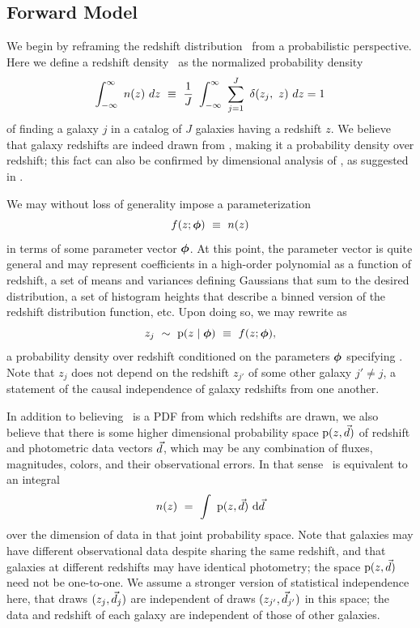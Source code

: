 \subsection{Forward Model}

We begin by reframing the redshift distribution \nz\ from a probabilistic perspective.
Here we define a redshift density \nz\ as the normalized probability density
\begin{equation}
\eqlabel{eqn:nz}
\int_{-\infty}^{\infty}\ n(z)\ dz\ \equiv\ \frac{1}{J}\ \int_{-\infty}^{\infty}\ \sum_{j=1}^{J}\ \delta(z_{j},\ z)\ dz = 1
\end{equation}
of finding a galaxy $j$ in a catalog of $J$ galaxies having a redshift $z$.
We believe that galaxy redshifts are indeed drawn from \nz, making it a probability density over redshift; this fact can also be confirmed by dimensional analysis of , as suggested in \citet{hogg_data_2012}.

We may without loss of generality impose a parameterization
\begin{equation}
\eqlabel{eqn:fz}
f(z; \ndphi)\ \equiv\ n(z)
\end{equation}
in terms of some parameter vector ${\boldsymbol{\phi}}$.
At this point, the parameter vector is quite general and may represent coefficients in a high-order polynomial as a function of redshift, a set of means and variances defining Gaussians that sum to the desired distribution, a set of histogram heights that describe a binned version of the redshift distribution function, etc.
Upon doing so, we may rewrite  as 
\begin{equation}
\eqlabel{eqn:pz}
z_{j}\ \sim\ \pr{z \gvn \ndphi}\ \equiv\ f(z; \ndphi),
\end{equation}
a probability density over redshift conditioned on the parameters ${\boldsymbol{\phi}}$ specifying \nz.
Note that $z_{j}$ does not depend on the redshift $z_{j'}$ of some other galaxy $j' \neq j$, a statement of the causal independence of galaxy redshifts from one another.

In addition to believing \nz\ is a PDF from which redshifts are drawn, we also believe that there is some higher dimensional probability space $\mathrm{p}(z, \vec{d})$ of redshift and photometric data vectors $\vec{d}$, which may be any combination of fluxes, magnitudes, colors, and their observational errors.
In that sense \nz\ is equivalent to an integral
\begin{equation}
\eqlabel{eqn:integral}
n(z)\ =\ \integral{\pr{z, \data}}{\data}
\end{equation}
over the dimension of data in that joint probability space.
Note that galaxies may have different observational data despite sharing the same redshift, and that galaxies at different redshifts may have identical photometry; the space $\mathrm{p}(z, \vec{d})$ need not be one-to-one.
We assume a stronger version of statistical independence here, that draws $(z_{j}, \vec{d}_{j})$ are independent of draws $(z_{j'}, \vec{d}_{j'})$ in this space; the data and redshift of each galaxy are independent of those of other galaxies.

